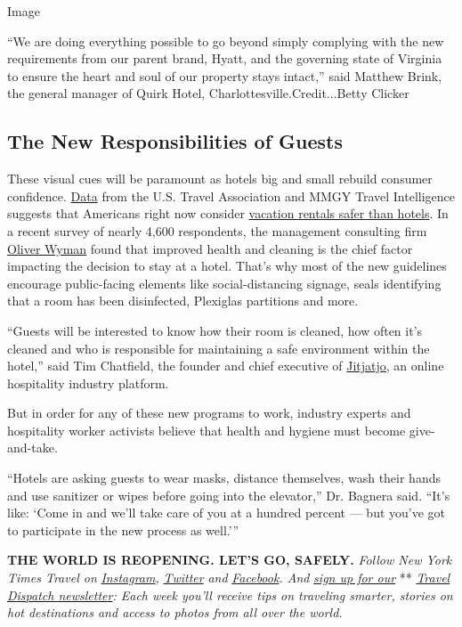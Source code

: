 Image

``We are doing everything possible to go beyond simply complying with
the new requirements from our parent brand, Hyatt, and the governing
state of Virginia to ensure the heart and soul of our property stays
intact,'' said Matthew Brink, the general manager of Quirk Hotel,
Charlottesville.Credit...Betty Clicker

\hypertarget{the-new-responsibilities-of-guests}{%
\subsection{The New Responsibilities of
Guests}\label{the-new-responsibilities-of-guests}}

These visual cues will be paramount as hotels big and small rebuild
consumer confidence.
\href{https://www.mmgyintel.com/travel-intentions-pulse-survey-tips-impact-covid-19}{Data}
from the U.S. Travel Association and MMGY Travel Intelligence suggests
that Americans right now consider
\href{https://www.nytimes3xbfgragh.onion/2020/05/14/travel/hotels-versus-airbnb-pandemic.html}{vacation
rentals safer than hotels}. In a recent survey of nearly 4,600
respondents, the management consulting firm
\href{http://oliverwyman.com/}{Oliver Wyman} found that improved health
and cleaning is the chief factor impacting the decision to stay at a
hotel. That's why most of the new guidelines encourage public-facing
elements like social-distancing signage, seals identifying that a room
has been disinfected, Plexiglas partitions and more.

``Guests will be interested to know how their room is cleaned, how often
it's cleaned and who is responsible for maintaining a safe environment
within the hotel,'' said Tim Chatfield, the founder and chief executive
of \href{https://www.jitjatjo.com/}{Jitjatjo,} an online hospitality
industry platform.

But in order for any of these new programs to work, industry experts and
hospitality worker activists believe that health and hygiene must become
give-and-take.

``Hotels are asking guests to wear masks, distance themselves, wash
their hands and use sanitizer or wipes before going into the elevator,''
Dr. Bagnera said. ``It's like: `Come in and we'll take care of you at a
hundred percent --- but you've got to participate in the new process as
well.'''

\textbf{THE WORLD IS REOPENING. LET'S GO, SAFELY.} \emph{Follow New York
Times Travel on}
\href{https://www.instagram.com/nytimestravel/}{\emph{Instagram}}\emph{,}
\href{https://twitter.com/nytimestravel}{\emph{Twitter}} \emph{and}
\href{https://www.facebookcorewwwi.onion/nytimestravel/}{\emph{Facebook}}\emph{.
And}
\href{https://www.nytimes3xbfgragh.onion/newsletters/traveldispatch?action=click\&module=inline\&pgtype=Article}{\emph{sign
up for our}} **
\href{https://www.nytimes3xbfgragh.onion/newsletters/traveldispatch}{\emph{Travel
Dispatch newsletter}}\emph{: Each week you'll receive tips on traveling
smarter, stories on hot destinations and access to photos from all over
the world.}

